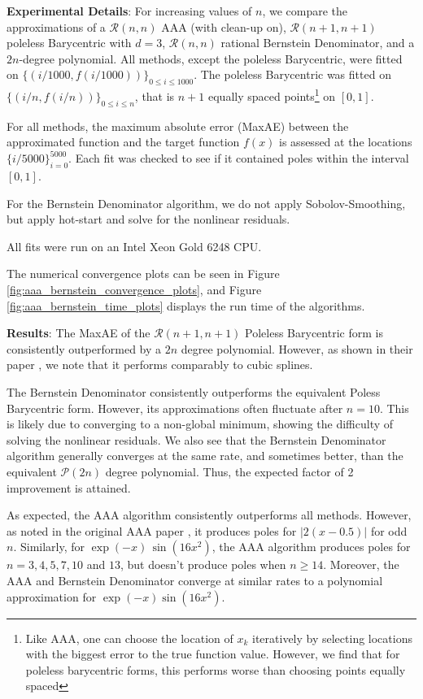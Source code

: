 \documentclass{article}
\begin{document}
{
\textbf{Experimental Details}: For increasing values of $n$, we compare the approximations of a $\mathcal{R}(n, n)$ AAA (with clean-up on), $\mathcal{R}(n + 1, n + 1)$ poleless Barycentric with $d=3$, $\mathcal{R}(n, n)$ rational Bernstein Denominator, and a $2n$-degree polynomial. All methods, except the poleless Barycentric, were fitted on $\{(i/1000, f(i/1000))\}_{0\leq i\leq 1000}$. The poleless Barycentric was fitted on $\{(i/n, f(i/n))\}_{0\leq i\leq n}$, that is $n + 1$ equally spaced points\footnote{Like AAA, one can choose the location of $x_k$ iteratively by selecting locations with the biggest error to the true function value. However, we find that for poleless barycentric forms, this performs worse than choosing points equally spaced} on $[0, 1]$.}

{
For all methods, the maximum absolute error (MaxAE) between the approximated function and the target function $f(x)$ is assessed at the locations $\{i/5000\}_{i=0}^{5000}$. Each fit was checked to see if it contained poles within the interval $[0, 1]$. }

{
For the Bernstein Denominator algorithm, we do not apply Sobolov-Smoothing, but apply hot-start and solve for the nonlinear residuals.}

{
All fits were run on an Intel Xeon Gold 6248 CPU.}

{The numerical convergence plots can be seen in Figure \ref{fig:aaa_bernstein_convergence_plots}, and Figure \ref{fig:aaa_bernstein_time_plots} displays the run time of the algorithms.}

{\textbf{Results}: The MaxAE of the $\mathcal{R}(n+1,n+1)$ Poleless Barycentric form is consistently outperformed by a $2n$ degree polynomial. However, as shown in their paper \cite{barycentric_poleless}, we note that it performs comparably to cubic splines.}

{The Bernstein Denominator consistently outperforms the equivalent Poless Barycentric form. However, its approximations often fluctuate after $n=10$. This is likely due to converging to a non-global minimum, showing the difficulty of solving the nonlinear residuals. We also see that the Bernstein Denominator algorithm generally converges at the same rate, and sometimes better, than the equivalent $\mathcal{P}(2n)$ degree polynomial. Thus, the expected factor of 2 improvement is attained.}

{As expected, the AAA algorithm consistently outperforms all methods. However, as noted in the original AAA paper \cite{AAA}, it produces poles for $|2(x-0.5)|$ for odd $n$. Similarly, for $\exp(-x)\, \sin(16x^2)$, the AAA algorithm produces poles for $n = 3, 4, 5, 7, 10$ and $13$, but doesn't produce poles when $n\geq 14$. Moreover, the AAA and Bernstein Denominator converge at similar rates to a polynomial approximation for $\exp(-x)\sin(16 x^2)$.}
\end{document}
